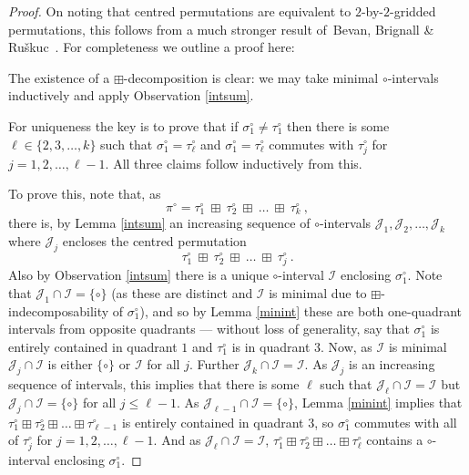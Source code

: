 \documentclass[11pt,a4paper]{article}
\theoremstyle{definition}
\begin{document}
\begin{proof}
On noting that centred permutations are equivalent to $2$-by-$2$-gridded permutations, this follows from a much stronger result of~{Bevan, Brignall \& Ru\v{s}kuc~\cite[Lemma 3.4]{bbr:unicyclicgrids:}}. For completeness we outline a proof here:

The existence of a $\boxplus$-decomposition is clear: we may take minimal $\circ$-intervals inductively and apply Observation \ref{intsum}.

For uniqueness the key is to prove that if $\sigma_{1}^{\circ} \neq \tau_{1}^{\circ}$ then there is some $\ell \in \{2,3, \dots, k\}$ such that $\sigma_{1}^{\circ} = \tau_{\ell}^{\circ}$ and $\sigma_{1}^{\circ} = \tau_{\ell}^{\circ}$ commutes with $\tau_{j}^{\circ}$ for $j = 1,2, \dots, \ell-1$. All three claims follow inductively from this.

To prove this, note that, as
\[
\pi^{\circ} = \tau_{1}^{\circ} \ \boxplus \ \tau_{2}^{\circ} \ \boxplus \ \dots \ \boxplus \ \tau_{k}^{\circ} \ ,
\]
there is, by Lemma \ref{intsum} an increasing sequence of $\circ$-intervals $\mathcal{J}_{1}, \mathcal{J}_{2}, \dots, \mathcal{J}_{k}$ where $\mathcal{J}_{j}$ encloses the centred permutation
\[
\tau_{1}^{\circ} \ \boxplus \ \tau_{2}^{\circ} \ \boxplus \ \dots \ \boxplus \ \tau_{j}^{\circ} \ .
\]
Also by Observation \ref{intsum} there is a unique $\circ$-interval $\mathcal{I}$ enclosing $\sigma_{1}^{\circ}$. Note that $\mathcal{J}_{1} \cap \mathcal{I} = \{\circ\}$ (as these are distinct and $\mathcal{I}$ is minimal due to $\boxplus$-indecomposability of $\sigma_{1}^{\circ}$), and so by Lemma \ref{minint} these are both one-quadrant intervals from opposite quadrants --- without loss of generality, say that $\sigma_{1}^{\circ}$ is entirely contained in quadrant $1$ and $\tau_{1}^{\circ}$ is in quadrant $3$. Now, as $\mathcal{I}$ is minimal $\mathcal{J}_{j} \cap \mathcal{I}$ is either $\{\circ\}$ or $\mathcal{I}$ for all $j$. Further $\mathcal{J}_{k} \cap \mathcal{I} = \mathcal{I}$. As $\mathcal{J}_{j}$ is an increasing sequence of intervals, this implies that there is some $\ell$ such that $\mathcal{J}_{\ell} \cap \mathcal{I} = \mathcal{I}$ but $\mathcal{J}_{j} \cap \mathcal{I} = \{\circ\}$ for all $j \leq \ell-1$. As $\mathcal{J}_{\ell-1} \cap \mathcal{I} = \{\circ\}$, Lemma \ref{minint} implies that $\tau_{1}^{\circ} \boxplus \tau_{2}^{\circ} \boxplus \dots \boxplus \tau_{\ell-1}^{\circ}$ is entirely contained in quadrant $3$, so $\sigma_{1}^{\circ}$ commutes with all of $\tau_{j}^{\circ}$ for $j = 1,2, \dots, \ell-1$. And as $\mathcal{J}_{\ell} \cap \mathcal{I} = \mathcal{I}$, $\tau_{1}^{\circ} \boxplus \tau_{2}^{\circ} \boxplus \dots \boxplus \tau_{\ell}^{\circ}$ contains a $\circ$-interval enclosing $\sigma_{1}^{\circ}$.


\end{proof}
\end{document}
